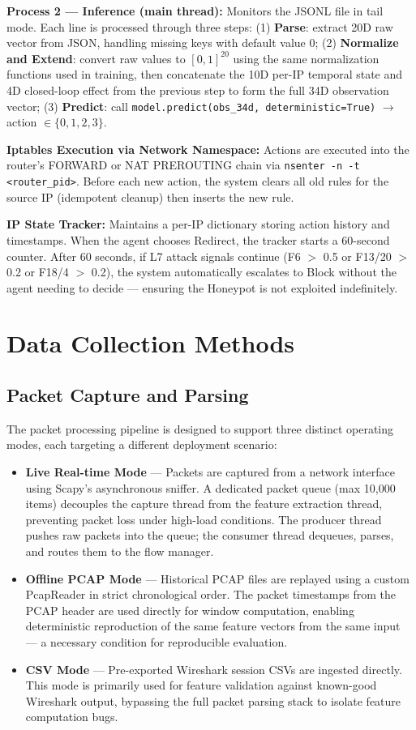 \documentclass[12pt,a4paper]{report}
\begin{document}
\textbf{Process 2 --- Inference (main thread):} Monitors the JSONL file in tail mode. Each line is processed through three steps: (1) \textbf{Parse}: extract 20D raw vector from JSON, handling missing keys with default value 0; (2) \textbf{Normalize and Extend}: convert raw values to $[0,1]^{20}$ using the same normalization functions used in training, then concatenate the 10D per-IP temporal state and 4D closed-loop effect from the previous step to form the full 34D observation vector; (3) \textbf{Predict}: call \texttt{model.predict(obs\_34d, deterministic=True)} $\to$ action $\in \{0, 1, 2, 3\}$.

\textbf{Iptables Execution via Network Namespace:} Actions are executed into the router's FORWARD or NAT PREROUTING chain via \texttt{nsenter -n -t <router\_pid>}. Before each new action, the system clears all old rules for the source IP (idempotent cleanup) then inserts the new rule.

\textbf{IP State Tracker:} Maintains a per-IP dictionary storing action history and timestamps. When the agent chooses Redirect, the tracker starts a 60-second counter. After 60 seconds, if L7 attack signals continue (F6 $>$ 0.5 or F13/20 $>$ 0.2 or F18/4 $>$ 0.2), the system automatically escalates to Block without the agent needing to decide --- ensuring the Honeypot is not exploited indefinitely.

\section{Data Collection Methods}

\subsection{Packet Capture and Parsing}

The packet processing pipeline is designed to support three distinct operating modes, each targeting a different deployment scenario:

\begin{itemize}
  \item \textbf{Live Real-time Mode} --- Packets are captured from a network interface using Scapy's asynchronous sniffer. A dedicated packet queue (max 10,000 items) decouples the capture thread from the feature extraction thread, preventing packet loss under high-load conditions. The producer thread pushes raw packets into the queue; the consumer thread dequeues, parses, and routes them to the flow manager.
  \item \textbf{Offline PCAP Mode} --- Historical PCAP files are replayed using a custom PcapReader in strict chronological order. The packet timestamps from the PCAP header are used directly for window computation, enabling deterministic reproduction of the same feature vectors from the same input --- a necessary condition for reproducible evaluation.
  \item \textbf{CSV Mode} --- Pre-exported Wireshark session CSVs are ingested directly. This mode is primarily used for feature validation against known-good Wireshark output, bypassing the full packet parsing stack to isolate feature computation bugs.
\end{itemize}
\end{document}
